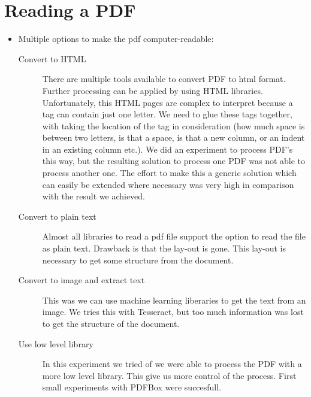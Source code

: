 \documentclass{ou-report}
\begin{document}
\section{Reading a PDF}
\begin{itemize}
    \item Multiple options to make the pdf computer-readable:
    \begin{description}
        \item[Convert to HTML] There are multiple tools available to convert PDF
            to html format. Further processing can be applied by using HTML
            libraries. Unfortunately, this HTML pages are complex to interpret
            because a tag can contain just one letter. We need to glue these 
            tags together, with taking the location of the tag in consideration
            (how much space is between two letters, is that a space, is that a 
            new column, or an indent in an existing column etc.). We did an 
            experiment to process PDF's this way, but the resulting solution to 
            process one PDF was not able to process another one. The effort to 
            make this a generic solution which can easily be extended where 
            necessary was very high in comparison with the result we achieved.

        \item[Convert to plain text] Almost all libraries to read a pdf file 
            support the option to read the file as plain text. Drawback is that
            the lay-out is gone. This lay-out is necessary to get some structure
            from the document.
        
        \item[Convert to image and extract text] This was we can use machine 
            learning liberaries to get the text from an image. We tries this 
            with Tesseract, but too much information was lost to get the 
            structure of the document.

        \item[Use low level library] In this experiment we tried of we were able
            to process the PDF with a more low level library. This give us more
            control of the process. First small experiments with PDFBox were 
            succesfull.
    \end{description}
\end{itemize}
\end{document}
